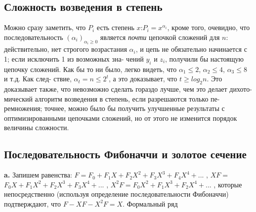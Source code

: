 \documentclass{mai_book}
\begin{document}
\subsection{Сложность возведения в степень}
\hspace*{15pt}Можно сразу заметить, что $P_i$ есть степень $x$:$ P_i=x^{\alpha_i}$, кроме того,
очевидно, что последовательность $(\alpha_i)_{\alpha_i\geq 0}$ является \textit{почти} цепочкой
сложений для $n$: действительно, нет строгого возрастания $\alpha_i$, и цепь
не обязательно начинается с 1; если исключить 1 из возможных зна­-
чений $y_i$ и $z_i$, получили бы настоящую цепочку сложений. Как бы то
ни было, легко видеть, что $\alpha_1\leq2$, $\alpha_2\leq 4$, $\alpha_3\leq8$ и т.д. Как след­-
ствие, $\alpha_t=n\leq2^t$, а это доказывает, что $t\geq log_2n$. Это доказывает
также, что невозможно сделать гораздо лучше, чем это делает дихото­-
мический алгоритм возведения в степень, если разрешаются только пе-
ремножения; точнее, можно было бы получить улучшенные результаты
с оптимизированными цепочками сложений, но от этого не изменится
порядок величины сложности.

\subsection{Последовательность Фибоначчи и золотое сечение}
\hspace*{15pt}\textbf{a.} Запишем равенства:\newline
\hspace*{80pt}$F=F_0+F_1X+F_2X^2+F_3X^3+F_4X^4+...$ ,\newline
\hspace*{71pt}$XF=$\hspace{26pt}$F_0X+F_1X^2+F_2X^3+F_3X^4+...$ ,\newline
\hspace*{67pt}$X^2F=$\hspace{58pt}$F_0X^2+F_1X^3+F_2X^4+...$ ,\newline
которые непосредственно (используя определение последовательности
Фибоначчи) подтверждают, что $F-XF-X^2F=X$. Формальный ряд\newpage
\end{document}
